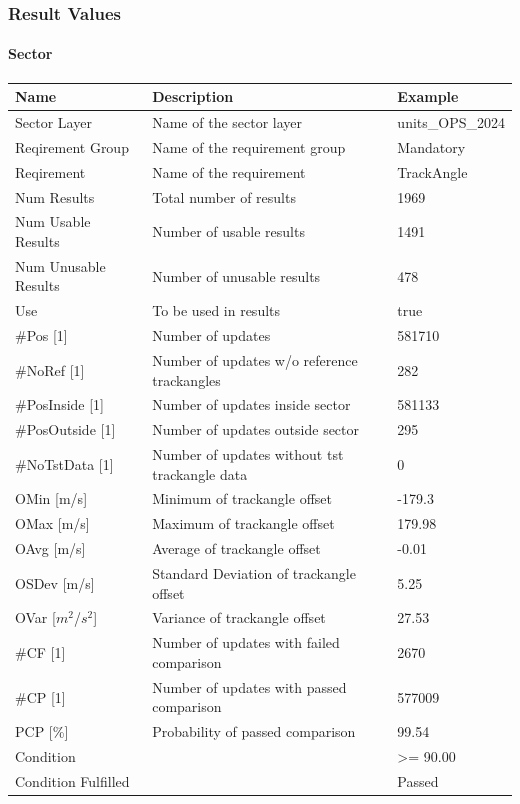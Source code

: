 \subsubsection{Result Values}

\paragraph{Sector}

\begin{center}
 \begin{table}[H]
  \begin{tabularx}{\textwidth}{ | l | X |  l | }
    \hline
    \textbf{Name} & \textbf{Description} & \textbf{Example} \\ \hline
    Sector Layer & Name of the sector layer & units\_OPS\_2024 \\ \hline
    Reqirement Group & Name of the requirement group & Mandatory \\ \hline
    Reqirement & Name of the requirement & TrackAngle \\ \hline
    Num Results & Total number of results & 1969 \\ \hline
    Num Usable Results & Number of usable results & 1491 \\ \hline
    Num Unusable Results & Number of unusable results & 478 \\ \hline
    Use & To be used in results & true \\ \hline
    \#Pos [1] & Number of updates & 581710 \\ \hline
    \#NoRef [1] & Number of updates w/o reference trackangles & 282 \\ \hline
    \#PosInside [1] & Number of updates inside sector & 581133 \\ \hline
    \#PosOutside [1] & Number of updates outside sector & 295 \\ \hline
    \#NoTstData [1] & Number of updates without tst trackangle data & 0 \\ \hline
    OMin [m/s] & Minimum of trackangle offset & -179.3 \\ \hline
    OMax [m/s] & Maximum of trackangle offset & 179.98 \\ \hline
    OAvg [m/s] & Average of trackangle offset & -0.01 \\ \hline
    OSDev [m/s] & Standard Deviation of trackangle offset & 5.25 \\ \hline
    OVar [$m^2$/$s^2$] & Variance of trackangle offset & 27.53 \\ \hline
    \#CF [1] & Number of updates with failed comparison & 2670 \\ \hline
    \#CP [1] & Number of updates with passed comparison & 577009 \\ \hline
    PCP [\%] & Probability of passed comparison & 99.54 \\ \hline
    Condition &  & >= 90.00 \\ \hline
    Condition Fulfilled &  & Passed \\ \hline
\end{tabularx}
\end{table}
\end{center}

